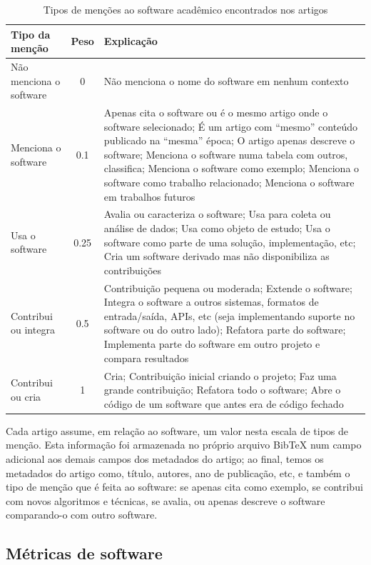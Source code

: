 \begin{table}[h]
\caption{Tipos de menções ao software acadêmico encontrados nos artigos}
\centering
\begin{tabular}{ l c p{10cm} }
  \hline
  Tipo da menção   & Peso & Explicação \\
  \hline
  Não menciona o software  & 0  & Não menciona o nome do software em nenhum contexto \\
  Menciona o software  & 0.1    & Apenas cita o software ou é o mesmo artigo onde o software selecionado; É um artigo com ``mesmo'' conteúdo publicado na ``mesma'' época; O artigo apenas descreve o software; Menciona o software numa tabela com outros, classifica; Menciona o software como exemplo; Menciona o software como trabalho relacionado; Menciona o software em trabalhos futuros \\
  Usa o software   & 0.25    & Avalia ou caracteriza o software; Usa para coleta ou análise de dados; Usa como objeto de estudo; Usa o software como parte de uma solução, implementação, etc; Cria um software derivado mas não disponibiliza as contribuições \\
  Contribui ou integra & 0.5 & Contribuição pequena ou moderada; Extende o software; Integra o software a outros sistemas, formatos de entrada/saída, APIs, etc (seja implementando suporte no software ou do outro lado); Refatora parte do software; Implementa parte do software em outro projeto e compara resultados \\
  Contribui ou cria & 1 & Cria; Contribuição inicial criando o projeto; Faz uma grande contribuição; Refatora todo o software; Abre o código de um software que antes era de código fechado \\
  \hline
\end{tabular}
\label{coding-scheme-mention}
\end{table}

Cada artigo assume, em relação ao software, um valor nesta escala de tipos de
menção. Esta informação foi armazenada no próprio arquivo BibTeX num campo
adicional aos demais campos dos metadados do artigo; ao final, temos os
metadados do artigo como, título, autores, ano de publicação, etc, e 
também o tipo de menção que é feita ao software: se apenas cita como exemplo,
se contribui com novos algoritmos e técnicas, se avalia, ou apenas descreve o
software comparando-o com outro software.

\subsection{Métricas de software}


